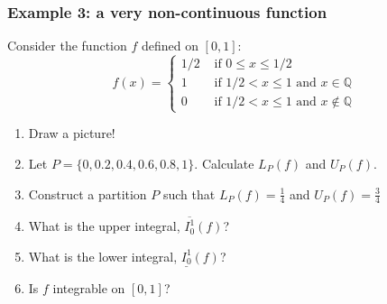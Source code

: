 \documentclass[14pt]{beamer}
\newcommand{\setsize}[1]{\fontsize{#1}{#1}\selectfont} %
\newcommand{\smallerfont}{\setsize{13}} %
\begin{document}
	\begin{frame}[t]
		\smallerfont
		\frametitle{Example 3: a very non-continuous function}

		Consider the function $f$ defined on $[0,1]$:
		\[
			f(x) =
			\begin{cases}
				1/2 & \mbox{ if } 0 \leq x \leq 1/2                               \\
				1   & \mbox{ if } 1/2 < x \leq 1 \mbox{ and } x \in \mathbb{Q}    \\
				0   & \mbox{ if } 1/2 < x \leq 1 \mbox{ and } x \notin \mathbb{Q}
			\end{cases}
		\]

		\begin{enumerate}
			\item Draw a picture!

			\item Let ${\displaystyle P= \{ 0, 0.2, 0.4, 0.6, 0.8, 1 \}}$. Calculate
				${\displaystyle L_P(f)}$ and ${\displaystyle U_P(f)}$.

			\item Construct a partition $P$ such that ${\displaystyle L_P(f) = \frac{1}{4}}$
				and ${\displaystyle U_P(f) = \frac{3}{4}}$

			\item What is the upper integral, $\overline{I_0^1}(f)$?

			\item What is the lower integral, $\underline{I_0^1}(f)$?

			\item Is $f$ integrable on $[0,1]$?
		\end{enumerate}
	\end{frame}
\end{document}
